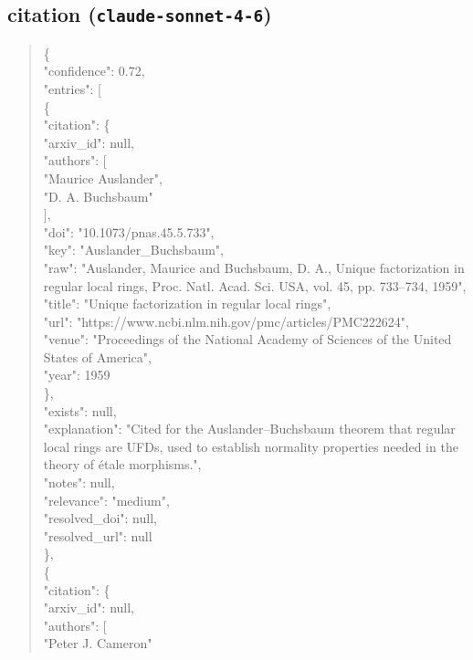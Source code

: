 \documentclass[11pt]{article}
\begin{document}
\subsection*{citation (\texttt{claude-sonnet-4-6})}
\begin{quote}\small\ttfamily\raggedright
\{\\
  "confidence": 0.72,\\
  "entries": [\\
    \{\\
      "citation": \{\\
        "arxiv\_id": null,\\
        "authors": [\\
          "Maurice Auslander",\\
          "D. A. Buchsbaum"\\
        ],\\
        "doi": "10.1073/pnas.45.5.733",\\
        "key": "Auslander\_Buchsbaum",\\
        "raw": "Auslander, Maurice and Buchsbaum, D. A., Unique factorization in regular local rings, Proc. Natl. Acad. Sci. USA, vol. 45, pp. 733--734, 1959",\\
        "title": "Unique factorization in regular local rings",\\
        "url": "https://www.ncbi.nlm.nih.gov/pmc/articles/PMC222624",\\
        "venue": "Proceedings of the National Academy of Sciences of the United States of America",\\
        "year": 1959\\
      \},\\
      "exists": null,\\
      "explanation": "Cited for the Auslander--Buchsbaum theorem that regular local rings are UFDs, used to establish normality properties needed in the theory of étale morphisms.",\\
      "notes": null,\\
      "relevance": "medium",\\
      "resolved\_doi": null,\\
      "resolved\_url": null\\
    \},\\
    \{\\
      "citation": \{\\
        "arxiv\_id": null,\\
        "authors": [\\
          "Peter J. Cameron"\\

\end{quote}
\end{document}
